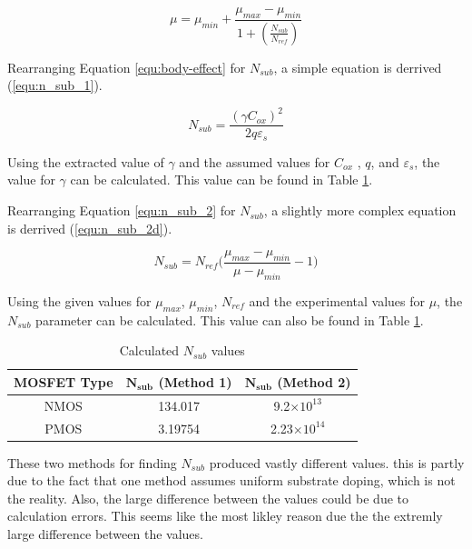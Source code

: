 \documentclass[11pt]{article}
\begin{document}
	\begin{equation}
		\label{equ:n_sub_2}
		\mu = \mu_{min} + \frac{\mu_{max} - \mu_{min}}{1+(\frac{N_{sub}}{N_{ref}})}
	\end{equation}

	Rearranging Equation \ref{equ:body-effect} for \(N_{sub}\), a simple
	equation is derrived (\ref{equ:n_sub_1}).

	\begin{equation}
		\label{equ:n_sub_1}
		N_{sub} = \frac{(\gamma C_{ox})^2}{2q\varepsilon_s}
	\end{equation}

	Using the extracted value of \(\gamma\) and the assumed values for \(C_{ox}\)
	, \(q\), and \(\varepsilon_s\), the value for \(\gamma\) can be calculated.
	This value can be found in Table \ref{table:Nsub}.
	
	\hfill \break

	Rearranging Equation \ref{equ:n_sub_2} for \(N_{sub}\), a slightly
	more complex equation is derrived (\ref{equ:n_sub_2d}).

	\begin{equation}
		\label{equ:n_sub_2d}
		N_{sub} = N_{ref}\bigg(\frac{\mu_{max} - \mu_{min}}{\mu-\mu_{min}} - 1\bigg)
	\end{equation}
	
	Using the given values for \(\mu_{max}\), \(\mu_{min}\), \(N_{ref}\) and the 
	experimental values for \(\mu\), the \(N_{sub}\) parameter can be calculated.
	This value can also be found in Table \ref{table:Nsub}.
	\begin{table}[H]
		\centering
		\caption{Calculated \(N_{sub}\) values}
		\label{table:Nsub}
		\begin{tabular}{|c|c|c|}
			\hline
			\textbf{MOSFET Type} & \(\mathbf{N_{sub}}\) (Method 1) & \(\mathbf{N_{sub}}\) (Method 2)\\
			\hline
			NMOS & 134.017 & 9.2$\times 10^{13}$\\
			PMOS & 3.19754 & 2.23$\times 10^{14}$\\
			\hline
		\end{tabular}
	\end{table}

	These two methods for finding $N_{sub}$ produced vastly different values.
	this is partly due to the fact that one method assumes uniform substrate
	doping, which is not the reality. Also, the large difference between the
	values could be due to calculation errors. This seems like the most likley
	reason due the the extremly large difference between the values.
\end{document}
